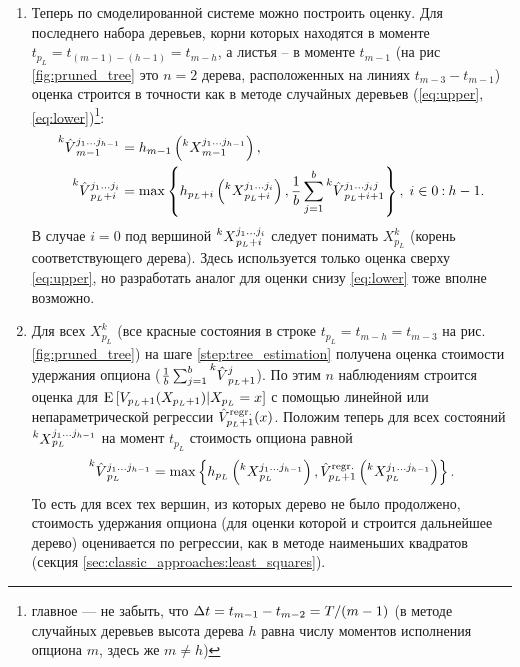 \begin{enumerate}[noitemsep]
	\item\label{step:tree_estimation} Теперь по смоделированной системе можно построить оценку. Для последнего набора деревьев, корни которых находятся в моменте $t_{p_L} = t_{(m-1) - (h-1)} = t_{m-h}$, а листья -- в моменте $t_{m-1}$ (на рис\,\ref{fig:pruned_tree} это $n=2$ дерева, расположенных на линиях $t_{m-3}-t_{m-1}$) оценка строится в точности как в методе случайных деревьев (\ref{eq:upper},\,\ref{eq:lower})\footnote{главное --- не забыть, что $\Delta t = t_{m-1} - t_{m-2} = T / (m-1)$ (в методе случайных деревьев высота дерева $h$ равна числу моментов исполнения опциона $m$, здесь же $m \neq h$)}:
	\begin{equation}\label{eq:pruned_tree_upper}\begin{aligned}
	    \prescript{k}{}{\hat{V}}_{m-1}^{j_1 \ldots j_{h-1}} &= h_{m-1}\left(\prescript{k}{}{X}_{m-1}^{j_1 \ldots j_{h-1}}\right), \\
	    \prescript{k}{}{\hat{V}}_{p_L+i}^{j_1 \ldots j_i} &= \max \left\lbrace h_{p_L+i} \left( \prescript{k}{}{X}_{p_L+i}^{j_1 \ldots j_i} \right), \frac{1}{b} \sum_{j = 1}^b \prescript{k}{}{\hat{V}}_{p_L+i+1}^{j_1 \ldots j_i j}\right\rbrace,\;i\in{0\mathbin{:}{h-1}}.
	\end{aligned}\end{equation}
	В случае $i=0$ под вершиной $\prescript{k}{}{X}_{p_L+i}^{j_1 \ldots j_i}$ следует понимать $X_{p_L}^k$ (корень соответствующего дерева). Здесь используется только оценка сверху \eqref{eq:upper}, но разработать аналог для оценки снизу \eqref{eq:lower} тоже вполне возможно.

	\item\label{step:estimate_continuation} Для всех $X_{p_L}^k$ (все красные состояния в строке $t_{p_L} = t_{m-h}=t_{m-3}$ на рис.\,\ref{fig:pruned_tree}) на шаге \ref{step:tree_estimation} получена оценка стоимости удержания опциона ($\frac{1}{b} \sum_{j = 1}^b \prescript{k}{}{\hat{V}}_{p_L+1}^{j}$). По этим $n$ наблюдениям строится оценка для 
	$\mathrm{E}\left[V_{p_L+1}(X_{p_L+1}) \middle\vert X_{p_L} = x \right]$ с помощью линейной или непараметрической регрессии $\hat{V}^{\mathrm{regr}.}_{p_L+1}(x)$. Положим теперь для всех состояний $\prescript{k}{}{X}_{p_L}^{j_1 \ldots j_{h-1}}$ на момент $t_{p_L}$ стоимость опциона равной 
	$$\prescript{k}{}{\hat{V}}_{p_L}^{j_1 \ldots j_{h-1}} = \max\left\lbrace h_{p_L}\left(\prescript{k}{}{X}_{p_L}^{j_1 \ldots j_{h-1}}\right), \hat{V}^{\mathrm{regr}.}_{p_L+1}\left(\prescript{k}{}{X}_{p_L}^{j_1 \ldots j_{h-1}}\right)\right\rbrace.$$
	То есть для всех тех вершин, из которых дерево не было продолжено, стоимость удержания опциона (для оценки которой и строится дальнейшее дерево) оценивается по регрессии, как в методе наименьших квадратов (секция \ref{sec:classic_approaches:least_squares}).


\end{enumerate}
